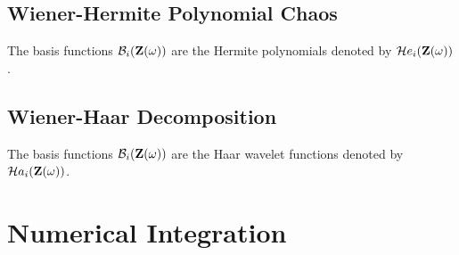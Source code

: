 \subsection{Wiener-Hermite Polynomial Chaos}
The basis functions $\mathcal{B}_i(\mathbf{Z}(\omega))$ are the Hermite polynomials denoted by $\mathcal{H}e_i(\mathbf{Z}(\omega))$.

\subsection{Wiener-Haar Decomposition}
The basis functions $\mathcal{B}_i(\mathbf{Z}(\omega))$ are the Haar wavelet functions denoted by $\mathcal{H}a_i(\mathbf{Z}(\omega))$.

\section{Numerical Integration}
